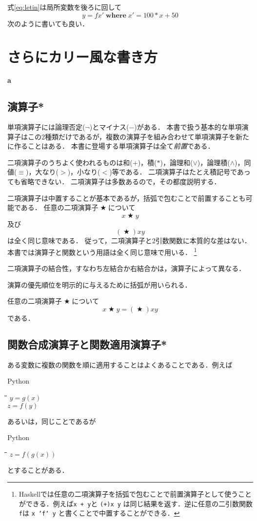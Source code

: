 \documentclass[twocolumn]{jsbook}
\newcommand{\keyword}[1]{{\emph{#1}}}
\newcommand{\code}[1]{\texttt{#1}}
\newenvironment{leader}{\begingroup\bf}{\endgroup}
\newenvironment{point}{\begin{screen}}{\end{screen}}
\newenvironment{pythoncode}{\begin{itembox}[r]{Python}}{\end{itembox}}
\newenvironment{python}{\begin{tabbing}\hspace*{1em}\=\hspace*{1em}\=\hspace*{1em}\=\hspace*{1em}\=\kill}{\end{tabbing}}
\newcommand{\mathKeyword}[1]{\mathbf{#1}}
\DeclareMathOperator{\mathAnyBinaryOperator}{\bigstar}
\DeclareMathOperator{\mathWhere}{\mathKeyword{where}}
\begin{document}
式\eqref{eq:letin}は局所変数を後ろに回して$$y=fx'\mathWhere x'=100*x+50$$次のように書いても良い．

\chapter{さらにカリー風な書き方}

\begin{leader}
a
\end{leader}


\section{演算子*}

単項演算子には論理否定($\neg$)とマイナス($-$)がある．
本書で扱う基本的な単項演算子はこの2種類だけであるが，複数の演算子を組み合わせて単項演算子を新たに作ることはある．
本書に登場する単項演算子は全て\keyword{前置}である．

二項演算子のうちよく使われるものは和($+$)，積($*$)，論理和($\vee$)，論理積($\wedge$)，同値($\equiv$)，大なり($>$)，小なり($<$)等である．
二項演算子はたとえ積記号であっても省略できない．
二項演算子は多数あるので，その都度説明する．

二項演算子は中置することが基本であるが，括弧で包むことで前置することも可能である．
任意の二項演算子$\mathAnyBinaryOperator$について$$x\mathAnyBinaryOperator y$$及び$$(\mathAnyBinaryOperator)xy$$は全く同じ意味である．
従って，二項演算子と2引数関数に本質的な差はない．
本書では演算子と関数という用語は全く同じ意味で用いる．
\footnote{Haskellでは任意の二項演算子を括弧で包むことで前置演算子として使うことができる．例えば\code{x + y}と \code{(+)x y} は同じ結果を返す．逆に任意の二引数関数\code{f}は \code{x `f` y} と書くことで中置することができる．}

二項演算子の結合性，すなわち左結合か右結合かは，演算子によって異なる．

演算の優先順位を明示的に与えるために括弧が用いられる．

\begin{point}
任意の二項演算子$\mathAnyBinaryOperator$について$$x\mathAnyBinaryOperator y=(\mathAnyBinaryOperator)xy$$である．
\end{point}

\section{関数合成演算子と関数適用演算子*}

ある変数に複数の関数を順に適用することはよくあることである．例えば
\begin{pythoncode}
\begin{python}
$y=g(x)$\\
$z=f(y)$
\end{python}
\end{pythoncode}
あるいは，同じことであるが
\begin{pythoncode}
\begin{python}
$z=f(g(x))$
\end{python}
\end{pythoncode}
とすることがある．
\end{document}
